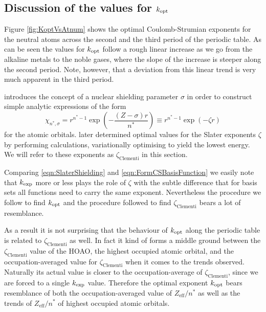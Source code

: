 \subsection{Discussion of the values for $k_\text{opt}$}

Figure \vref{fig:KoptVsAtnum} shows the optimal Coulomb-Strumian exponents
for the neutral atoms across the second and the third period of the periodic table.
As can be seen the values for $k_\text{opt}$ follow a rough linear increase
as we go from the alkaline metals to the noble gases,
where the slope of the increase is steeper along the second period.
Note, however, that a deviation from this linear trend
is very much apparent in the third period.

\citet{Slater1930} introduces the concept of a nuclear shielding parameter $\sigma$
in order to construct simple analytic expressions of the form
\begin{equation}
	\chi_{n^\ast, \sigma} = r^{n^\ast - 1} \exp\left( - \frac{(Z - \sigma)r}{n^\ast} \right)
	\equiv r^{n^\ast - 1} \exp\left( -\zeta r\right)
	\label{eqn:SlaterShielding}
\end{equation}
for the atomic orbitals.
\citet{Clementi1963} later determined optimal values for the Slater exponents $\zeta$
by performing \HF calculations,
variationally optimising to yield the lowest energy.
We will refer to these exponents as $\zeta_\text{Clementi}$ in this section.

Comparing \eqref{eqn:SlaterShielding} and \eqref{eqn:FormCSBasisFunction}
we easily note that $k_\text{exp}$ more or less plays the role of $\zeta$
with the subtle difference that for \CS basis sets all functions
need to carry the same exponent.
Nevertheless the procedure we follow to find $k_\text{opt}$ and the procedure
\citeauthor{Clementi1963} followed to find $\zeta_\text{Clementi}$
bears a lot of resemblance.

As a result it is not surprising that the behaviour of $k_\text{opt}$
along the periodic table is related to $\zeta_\text{Clementi}$ as well.
In fact it kind of forms a middle ground between the $\zeta_\text{Clementi}$
value of the HOAO, the highest occupied atomic orbital,
and the occupation-averaged value for $\zeta_\text{Clementi}$
when it comes to the trends observed.
Naturally its actual value is closer to the occupation-average
of $\zeta_\text{Clementi}$,
since we are forced to a single $k_\text{exp}$ value.
Therefore the optimal exponent $k_\text{opt}$ bears resemblance of both
the occupation-averaged value of $Z_\text{eff} / n^\ast$
as well as the trends of $Z_\text{eff} / n^\ast$ of highest occupied
atomic orbitals.

